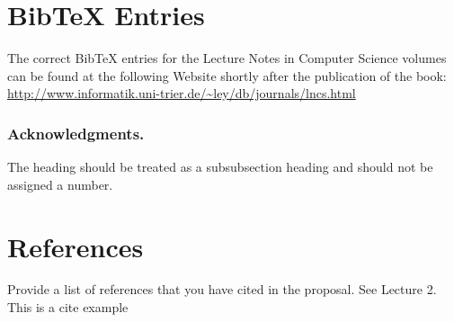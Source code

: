 \documentclass[runningheads,a4paper]{llncs}
\begin{document}
\section{BibTeX Entries}

The correct BibTeX entries for the Lecture Notes in Computer Science
volumes can be found at the following Website shortly after the
publication of the book:
\url{http://www.informatik.uni-trier.de/~ley/db/journals/lncs.html}

\subsubsection*{Acknowledgments.} The heading should be treated as a
subsubsection heading and should not be assigned a number.

\section{References}\label{references}

Provide a list of references that you have cited in the proposal. See Lecture 2.\\

This is a cite example \cite{mersmann2011exploratory}



\end{document}
